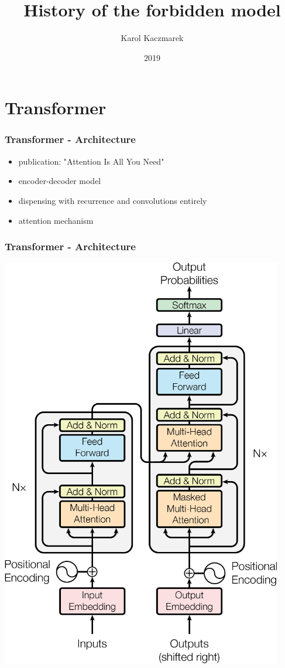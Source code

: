 \documentclass{beamer}
\title{History of the forbidden model}
\author[{K. Kaczmarek}]{Karol Kaczmarek}
\date{2019}
\begin{document}
\begin{frame}
    \titlepage
\end{frame}



\section{Transformer}

\begin{frame}
    \frametitle{Transformer - Architecture}
    \begin{itemize}
        \item publication: "Attention Is All You Need" \cite{transformer}
        \item encoder-decoder model
        \item dispensing with recurrence and convolutions entirely
        \item attention mechanism
    \end{itemize}
\end{frame}

\begin{frame}
    \frametitle{Transformer - Architecture}
    \begin{center}
        \includegraphics[scale=1.15]{img/transformer.png}
    \end{center}
\end{frame}
\end{document}
